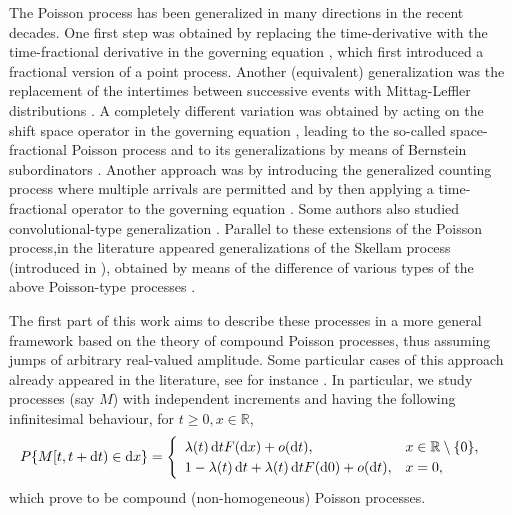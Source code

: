 \documentclass[12pt, twoside, english, headsepline]{article}
\newcommand*\dif{\mathop{}\!\mathrm{d}}  %
\theoremstyle{definition} %
\numberwithin{equation}{section} %
\begin{document}
The Poisson process has been generalized in many directions in the recent decades. One first step was obtained by replacing the time-derivative with the time-fractional derivative in the governing equation \cite{L2003}, which first introduced a fractional version of a point process. Another (equivalent) generalization was the replacement of the intertimes between successive events with Mittag-Leffler distributions \cite{MGS2004, MNV2011}. A completely different variation was obtained by acting on the shift space operator in the governing equation \cite{OP2012}, leading to the so-called space-fractional Poisson process and to its generalizations by means of Bernstein subordinators \cite{OT2015}. Another approach was by introducing the generalized counting process where multiple arrivals are permitted \cite{P1984} and by then applying a time-fractional operator to the governing equation \cite{DcMM2016}. Some authors also studied convolutional-type generalization \cite{KM2021}. Parallel to these extensions of the Poisson process,in the literature appeared generalizations of the Skellam process (introduced in \cite{S1946}), obtained by means of the difference of various types of the above Poisson-type processes \cite{BS2024, CO202, KK2024, KV2019, MV2019}.

The first part of this work aims to describe these processes in a more general framework based on the theory of compound Poisson processes, thus assuming jumps of arbitrary real-valued amplitude. Some particular cases of this approach already appeared in the literature, see for instance \cite{BM2012, BM2014, DcMZ2015, KK2023, S2013}. In particular, we study processes (say $M$) with independent increments and having the following infinitesimal behaviour, for $t\ge0, x\in\mathbb{R}$,
\begin{align*}\label{compoundPoissonInfinitesimaleIntroduzione}
	P\{M[t,t+\dif t) \in \dif x\} = \begin{cases}
		\begin{array}{l l}
			\lambda(t)\dif t F(\dif x) + o(\dif t), & x\in\mathbb{R}\setminus\{0\},\\
			1-\lambda(t)\dif t + \lambda(t)\dif t F(\dif 0) + o(\dif t), & x = 0,
		\end{array}
	\end{cases} 
\end{align*}
which prove to be compound (non-homogeneous) Poisson processes. 
\end{document}
